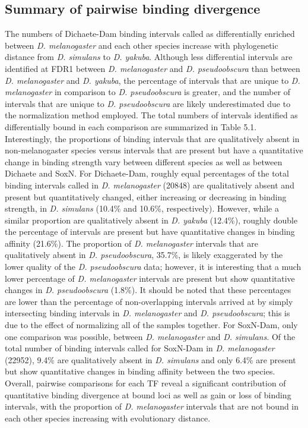 \subsection{Summary of pairwise binding divergence}
The numbers of Dichaete-Dam binding intervals called as differentially enriched between \emph{D. melanogaster} and each other species increase with phylogenetic distance from \emph{D. simulans} to \emph{D. yakuba}. Although less differential intervals are identified at FDR1 between \emph{D. melanogaster} and \emph{D. pseudoobscura} than between \emph{D. melanogaster} and \emph{D. yakuba}, the percentage of intervals that are unique to \emph{D. melanogaster} in comparison to \emph{D. pseudoobscura} is greater, and the number of intervals that are unique to \emph{D. pseudoobscura} are likely underestimated due to the normalization method employed. The total numbers of intervals identified as differentially bound in each comparison are summarized in Table 5.1. Interestingly, the proportions of binding intervals that are qualitatively absent in non-melanogaster species versus intervals that are present but have a quantitative change in binding strength vary between different species as well as between Dichaete and SoxN. For Dichaete-Dam, roughly equal percentages of the total binding intervals called in \emph{D. melanogaster} (20848) are qualitatively absent and present but quantitatively changed, either increasing or decreasing in binding strength, in \emph{D. simulans} (10.4\% and 10.6\%, respectively). However, while a similar proportion are qualitatively absent in \emph{D. yakuba} (12.4\%), roughly double the percentage of intervals are present but have quantitative changes in binding affinity (21.6\%). The proportion of \emph{D. melanogaster} intervals that are qualitatively absent in \emph{D. pseudoobscura}, 35.7\%, is likely exaggerated by the lower quality of the \emph{D. pseudoobscura} data; however, it is interesting that a much lower percentage of \emph{D. melanogaster} intervals are present but show quantitative changes in \emph{D. pseudoobscura} (1.8\%). It should be noted that these percentages are lower than the percentage of non-overlapping intervals arrived at by simply intersecting binding intervals in \emph{D. melanogaster} and \emph{D. pseudoobscura}; this is due to the effect of normalizing all of the samples together. For SoxN-Dam, only one comparison was possible, between \emph{D. melanogaster} and \emph{D. simulans}. Of the total number of binding intervals called for SoxN-Dam in \emph{D. melanogaster} (22952), 9.4\% are qualitatively absent in \emph{D. simulans} and only 6.4\% are present but show quantitative changes in binding affinity between the two species. Overall, pairwise comparisons for each TF reveal a significant contribution of quantitative binding divergence at bound loci as well as gain or loss of binding intervals, with the proportion of \emph{D. melanogaster} intervals that are not bound in each other species increasing with evolutionary distance.

